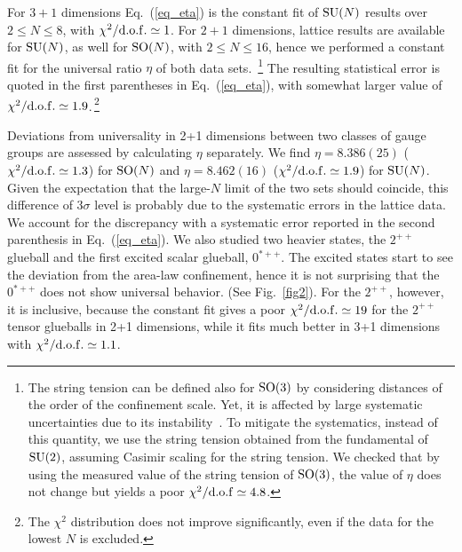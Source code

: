 \documentclass[prl,aps,
showpacs,
preprint,
nofootinbib,
floatfix,
superscriptaddress, showkeys
]{revtex4-1}
\begin{document}
For  $3+1$ dimensions Eq.~(\ref{eq_eta})  is the constant fit of ${\rm SU}(N)$ results 
 over  $2\le N\le8$, with  $\chi^2/{\rm d.o.f.}\simeq 1$.
For  $2+1$ dimensions, lattice results  are available for ${\rm SU}(N)$, as well for ${\rm SO}(N)$,  with $2\le N\le16$,
hence we performed a constant fit for the universal ratio $\eta$ of both data sets.~\footnote{
The string tension can be defined also for ${\rm SO}(3)$ by considering distances of the order of the confinement scale. Yet, it is affected by large 
systematic uncertainties due to its instability~\cite{Athenodorou:2015nba,Lau:2017aom}. 
To mitigate the systematics, instead of this quantity, we use the string 
tension obtained from the fundamental of ${\rm SU}(2)$, assuming Casimir scaling for the 
string tension. 
We checked that by using the measured value of the string tension of ${\rm SO}(3)$, the value of $\eta$ 
does not change but yields a poor $\chi^2/{\rm d.o.f} \simeq 4.8$. 
}
The resulting statistical error is quoted in the first parentheses in Eq.~(\ref{eq_eta}), 
with somewhat larger value of $\chi^2/{\rm d.o.f.}\simeq 1.9$.\,\footnote{The $\chi^2$ distribution does not improve significantly, even if the data for the lowest $N$ is excluded.} 

Deviations from universality in 2+1 dimensions between two classes of gauge groups
are assessed by calculating $\eta$ separately.
We find $\eta=8.386(25)$ ($\chi^2/{\rm d.o.f.}\simeq 1.3$) for ${\rm SO}(N)$ and $\eta=8.462(16)$ ($\chi^2/{\rm d.o.f.}\simeq 1.9$)
for ${\rm SU}(N)$.
Given the expectation that the large-$N$ limit of the two sets should coincide, this difference of $3\sigma$ level is probably due to the systematic errors in the lattice data. We account for the discrepancy with a systematic error reported in the second parenthesis in Eq.~(\ref{eq_eta}).
We also studied two heavier states, the $2^{++}$ glueball and the first excited scalar glueball, $0^{\ast++}$. 
The excited states start to see the deviation from the area-law confinement, hence it is not surprising that the $0^{\ast++}$ does not show universal behavior. (See Fig.~\ref{fig2}).  For the $2^{++}$, however, it is inclusive, because the constant fit gives a poor $\chi^2/{\rm d.o.f.}\simeq 19$ for the $2^{++}$  tensor glueballs in 2+1 dimensions, while it fits much better in 3+1 dimensions with $\chi^2/{\rm d.o.f.}\simeq1.1$. 
\end{document}
